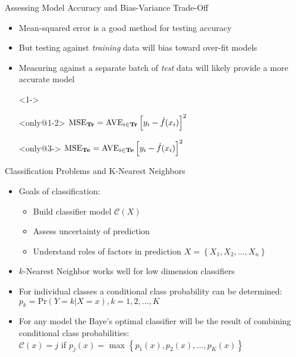 \documentclass{beamer}
\begin{document}
\begin{frame}{Assessing Model Accuracy and Bias-Variance Trade-Off}
	\begin{itemize}
		\item<1-> Mean-squared error is a good method for testing accuracy
		\item<2-> But testing against \emph{training} data will bias toward over-fit models
		\item<3-> Measuring against a separate batch of \emph{test} data will likely provide a more accurate model 
		\item[]<1->
		\item[]<only@1-2> \hspace{3em}
			$\text{MSE}_{\text{\textbf{Tr}}}=\text{AVE}_{i\in\text{\textbf{Tr}}}\left[y_i-\hat{f}(x_i)\right]^2$
		\item[]<only@3-> \hspace{3em}
			$\text{MSE}_{\text{\textbf{Te}}}=\text{AVE}_{i\in\text{\textbf{Te}}}\left[y_i-\hat{f}(x_i)\right]^2$
	\end{itemize}
\end{frame}


\begin{frame}{Classification Problems and K-Nearest Neighbors}
	\begin{itemize}%
		\item Goals of classification:
		\begin{itemize}%
			\item Build classifier model $\mathcal{C}(X)$
			\item Assess uncertainty of prediction
			\item Understand roles of factors in prediction $X =\left\lbrace X_1, X_2, \ldots, X_n \right\rbrace $
		\end{itemize}
	\pause
		\item $k$-Nearest Neighbor works well for low dimension classifiers
		\item For individual classes a conditional class probability can be determined:
			\\ \vspace{0.5em} \hspace{4em}$p_k = \text{Pr}(Y=k|X=x), k=1,2,\ldots,K$
	\pause
		\item For any model the Baye's optimal classifier will be the result of combining conditional class probabilities:
			\\ \vspace{0.5em} \hspace{4em}$\mathcal{C}(x)=j $
			if $p_j(x) = $ max $\left\lbrace p_1(x), p_2(x),\ldots, p_K(x)\right\rbrace$
	\end{itemize}
\end{frame}

\end{document}
